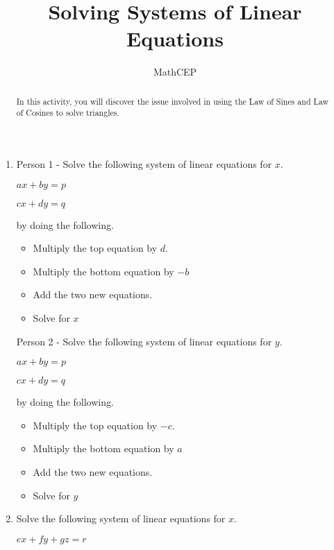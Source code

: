 \documentclass[number]{ximera}
\title{Solving Systems of Linear Equations}
\author{MathCEP}
\begin{document}
\begin{abstract}
  In this activity, you will discover the issue involved in using the Law of Sines and Law of Cosines to solve triangles.
\end{abstract}

\maketitle

\begin{enumerate}

\item Person 1 - Solve the following system of linear equations for $x$.

\begin{center}
$ax+by=p$

$cx+dy=q$
\end{center}

by doing the following.

\bigskip

\begin{itemize}
\item Multiply the top equation by $d$.
\item Multiply the bottom equation by $-b$
\item Add the two new equations.
\item Solve for $x$
\end{itemize}

Person 2 - Solve the following system of linear equations for $y$.

\begin{center}
$ax+by=p$

$cx+dy=q$
\end{center}

by doing the following.

\bigskip

\begin{itemize}
\item Multiply the top equation by $-c$.
\item Multiply the bottom equation by $a$
\item Add the two new equations.
\item Solve for $y$
\end{itemize}

\item Solve the following system of linear equations for $x$.

\begin{center}
$ex+fy+gz=r$


\end{center}
\end{enumerate}
\end{document}
